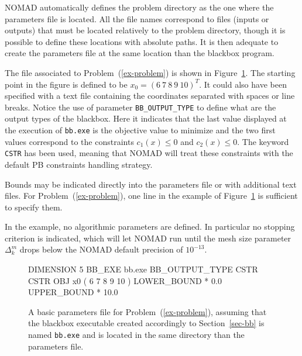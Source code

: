 \documentclass[12pt,english]{article}
\newcommand{\nomad}{NOMAD\xspace}
\newcommand{\bb}{blackbox\xspace}
\begin{document}
\nomad automatically defines the problem directory as the one where the parameters file
  is located.
All the file names correspond to files
  (inputs or outputs) that must be located
        relatively to the problem directory, though it is possible to define
        these locations with absolute paths.
It is then adequate to create the parameters file at the same location than the \bb program.

The file associated to Problem~(\ref{ex-problem}) is shown in Figure~\ref{fig-ex-param}.
The starting point in the figure is defined to be $x_0=(6~7~8~9~10)^T$.
    It could also have been specified with a text file containing the coordinates
    separated with spaces or line breaks.
Notice the use of parameter \texttt{BB\_OUTPUT\_TYPE} to define
  what are the output types of the \bb. Here it indicates that the
  last value displayed at the execution of \texttt{bb.exe} is the objective value
  to minimize and the two first values correspond to the constraints
  $c_1(x) \leq 0$ and $c_2(x) \leq 0$.
The keyword \texttt{CSTR} has been used, meaning that \nomad will treat these constraints
  with the default PB constraints handling strategy. %

  Bounds may be indicated directly into
         the parameters file or with additional text files.
        For Problem~(\ref{ex-problem}), one line in the example
        of Figure~\ref{fig-ex-param} is sufficient to specify them.

In the example, no algorithmic parameters are defined.
In particular no
       stopping criterion is indicated, which will let \nomad run until
       the mesh size parameter $\Delta_k^m$ drops below the \nomad default precision
       of $10^{-13}$.

\begin{figure}[ht]
\begin{center}
\begin{boxedverbatim}
DIMENSION      5
BB_EXE         bb.exe
BB_OUTPUT_TYPE CSTR CSTR OBJ
x0             ( 6 7 8 9 10 )
LOWER_BOUND    * 0.0
UPPER_BOUND    * 10.0
\end{boxedverbatim}
\end{center}
\caption{A basic parameters file for Problem~(\ref{ex-problem}),
              assuming that the \bb executable created accordingly to
              Section~\ref{sec-bb} is named \texttt{bb.exe} and is located
              in the same directory than the parameters file.}
\label{fig-ex-param}
\end{figure}
\end{document}
